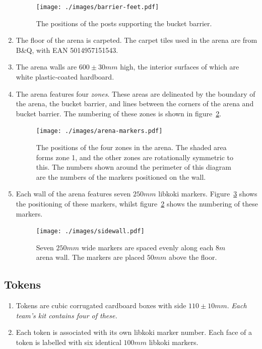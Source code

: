 \begin{enumerate}
  \begin{figure}
    \centering
    \texttt{[image: ./images/barrier-feet.pdf]}
    \caption{The positions of the posts supporting the bucket barrier.}
    \label{fig:bucket-barrier-legs}
  \end{figure}

\item The floor of the arena is carpeted.  The carpet tiles used in the arena are from B\&Q, with EAN 5014957151543.

\item The arena walls are $600\pm30mm$ high, the interior surfaces of which are white plastic-coated hardboard.

\item The arena features four \textit{zones}.  These areas are delineated by the boundary of the arena, the bucket barrier, and lines between the corners of the arena and bucket barrier.  The numbering of these zones is shown in figure~\ref{fig:arena-zones}.

  \begin{figure}
    \centering
    \texttt{[image: ./images/arena-markers.pdf]}
    \caption{The positions of the four zones in the arena.  The shaded area forms zone 1, and the other zones are rotationally symmetric to this.  The numbers shown around the perimeter of this diagram are the numbers of the markers positioned on the wall.}
    \label{fig:arena-zones}
  \end{figure}

\item Each wall of the arena features seven $250mm$ libkoki markers.  Figure~\ref{fig:arena-wall} shows the positioning of these markers, whilst figure~\ref{fig:arena-zones} shows the numbering of these markers.

  \begin{figure}
    \centering
    \texttt{[image: ./images/sidewall.pdf]}
    \caption{Seven $250mm$ wide markers are spaced evenly along each $8m$ arena wall.  The markers are placed $50mm$ above the floor.}
    \label{fig:arena-wall}
  \end{figure}

\end{enumerate}

\subsection{Tokens}
\label{sub:Tokens}
\begin {enumerate}
\item Tokens are cubic corrugated cardboard boxes with side $110 \pm 10 mm$.
\emph{Each team's kit contains four of these.}

\item Each token is associated with its own libkoki marker number.  Each face of a token is labelled with six identical $100mm$ libkoki markers.
\end {enumerate}

